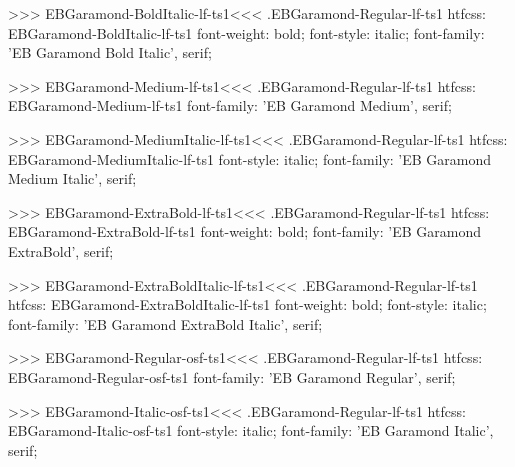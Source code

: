 {{{{{{{>>>
\<EBGaramond-BoldItalic-lf-ts1\><<<
.EBGaramond-Regular-lf-ts1
htfcss:  EBGaramond-BoldItalic-lf-ts1  font-weight: bold; font-style: italic; font-family: 'EB Garamond Bold Italic', serif;

>>>
\<EBGaramond-Medium-lf-ts1\><<<
.EBGaramond-Regular-lf-ts1
htfcss:  EBGaramond-Medium-lf-ts1  font-family: 'EB Garamond Medium', serif;

>>>
\<EBGaramond-MediumItalic-lf-ts1\><<<
.EBGaramond-Regular-lf-ts1
htfcss:  EBGaramond-MediumItalic-lf-ts1  font-style: italic; font-family: 'EB Garamond Medium Italic', serif;

>>>
\<EBGaramond-ExtraBold-lf-ts1\><<<
.EBGaramond-Regular-lf-ts1
htfcss:  EBGaramond-ExtraBold-lf-ts1  font-weight: bold; font-family: 'EB Garamond ExtraBold', serif;

>>>
\<EBGaramond-ExtraBoldItalic-lf-ts1\><<<
.EBGaramond-Regular-lf-ts1
htfcss:  EBGaramond-ExtraBoldItalic-lf-ts1  font-weight: bold; font-style: italic; font-family: 'EB Garamond ExtraBold Italic', serif;

>>>
\<EBGaramond-Regular-osf-ts1\><<<
.EBGaramond-Regular-lf-ts1
htfcss:  EBGaramond-Regular-osf-ts1  font-family: 'EB Garamond Regular', serif;

>>>
\<EBGaramond-Italic-osf-ts1\><<<
.EBGaramond-Regular-lf-ts1
htfcss:  EBGaramond-Italic-osf-ts1  font-style: italic; font-family: 'EB Garamond Italic', serif;

}}}}}}}

